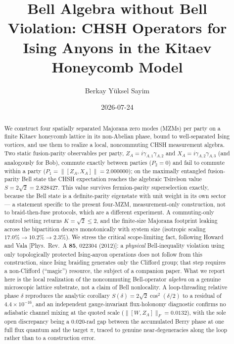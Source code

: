 \documentclass[aps,pra,twocolumn,superscriptaddress,floatfix,nofootinbib]{revtex4-2}
\begin{document}
\setcounter{secnumdepth}{3}

\title{Bell Algebra without Bell Violation: CHSH Operators for Ising Anyons in the Kitaev Honeycomb Model}

\author{Berkay Y\"uksel Sayim}

\date{2026-07-24}

\begin{abstract}
We construct four spatially separated Majorana zero modes (MZMs) per
party on a finite Kitaev honeycomb lattice in its non-Abelian phase,
bound to well-separated Ising vortices, and use them to realize a
local, noncommuting CHSH measurement algebra. Two static fusion-parity
observables per party, $Z_A=i\gamma_{A,1}\gamma_{A,2}$ and
$X_A=i\gamma_{A,2}\gamma_{A,3}$ (and analogously for Bob), commute
exactly between parties ($P_2=0$) and fail to commute within a party
($P_1=\lVert[Z_A,X_A]\rVert=2.000000$); on the maximally entangled
fusion-parity Bell state the CHSH expectation reaches the algebraic
Tsirelson value $S=2\sqrt2=2.828427$. This value survives fermion-parity
superselection exactly, because the Bell state is a definite-parity
eigenstate with unit weight in its own sector --- a statement specific
to the present four-MZM, measurement-only construction, not to
braid-then-fuse protocols, which are a different experiment. A
commuting-only control
setting returns $K=\sqrt2\le2$, and the finite-size Majorana footprint
leaking across the bipartition decays monotonically with system size
(isotropic scaling $17.0\%\to10.2\%\to2.3\%$). We stress the critical
scope-limiting fact, following Howard and Vala [Phys.\ Rev.\ A
\textbf{85}, 022304 (2012)]: a \emph{physical} Bell-inequality violation
using only topologically protected Ising-anyon operations does not
follow from this construction, since Ising braiding generates only the
Clifford group; that step requires a non-Clifford (``magic'') resource,
the subject of a companion paper. What we report here is the local
realization of the noncommuting Bell-operator \emph{algebra} on a
genuine microscopic lattice substrate, not a claim of Bell nonlocality.
A loop-threading relative phase $\delta$ reproduces the analytic
corollary $S(\delta)=2\sqrt2\cos^2(\delta/2)$ to a residual of
$4.4\times10^{-16}$, and an independent gauge-invariant flux-holonomy
diagnostic confirms no adiabatic channel mixing at the quoted scale
($\lVert[W,Z_A]\rVert_F=0.0132$), with the sole open discrepancy being a
$0.020$-rad gap between the accumulated Berry phase at one full flux
quantum and the target $\pi$, traced to genuine near-degeneracies along
the loop rather than to a construction error.
\end{abstract}
\end{document}
